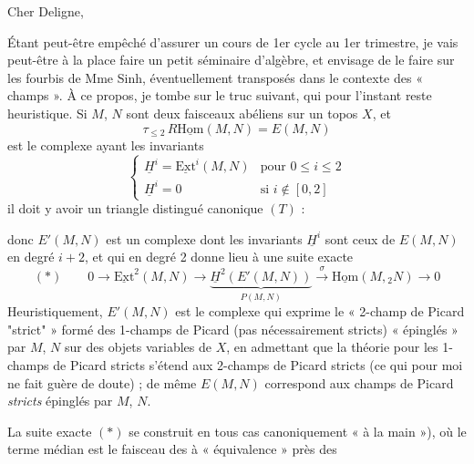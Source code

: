 \documentclass[11pt,a4paper]{article}
\begin{document}
Cher Deligne,

Étant peut-être empêché  d'assurer un cours de 1er
cycle au 1er trimestre, je vais peut-être à la place faire un petit
séminaire d'algèbre, et envisage de le faire sur les fourbis de Mme Sinh,
éventuellement transposés dans le contexte des « champs ». À ce propos, je
tombe sur le truc suivant, qui pour l'instant reste heuristique. Si $M$,
$N$ sont deux faisceaux abéliens sur un topos $X$, et
\[ \tau_{\leq 2}\, R\underline{\mathrm{Hom}}(M,N) = E(M,N) \]
est le complexe ayant les invariants
\[ \begin{cases}
\underline{H}^i = \underline{\mathrm{Ext}}^i(M,N) & \text{pour } 0 \leq i \leq 2 \\
\underline{H}^i = 0 & \text{si } i \notin [0,2]
\end{cases} \]
il doit y avoir un triangle distingué canonique $(T)$ :


donc $E'(M,N)$ est un complexe dont les invariants $\underline{H}^i$ sont
ceux de $E(M,N)$ en degré $i+2$, et qui en degré 2 donne lieu à une suite
exacte
\[ (*) \qquad 0 \longrightarrow \underline{\mathrm{Ext}}^2(M,N)
   \longrightarrow \underbrace{\underline{H}^2(E'(M,N))}_{P(M,N)}
   \xrightarrow{\ \sigma\ } \underline{\mathrm{Hom}}(M, {}_2 N)
   \longrightarrow 0 \]
Heuristiquement, $E'(M,N)$ est le complexe qui exprime le « 2-champ de
Picard "strict" » formé des 1-champs de Picard (pas nécessairement stricts)
« épinglés » par $M$, $N$ sur des objets variables de $X$, en admettant que
la théorie pour les 1-champs de Picard stricts s'étend aux 2-champs de
Picard stricts (ce qui pour moi ne fait guère de doute) ; de même $E(M,N)$
correspond aux champs de Picard \emph{stricts} épinglés par $M$, $N$.

La suite exacte $(*)$ se construit en tous cas canoniquement « à la
main »), où le terme médian est le faisceau des  à
« équivalence » près des

\end{document}
